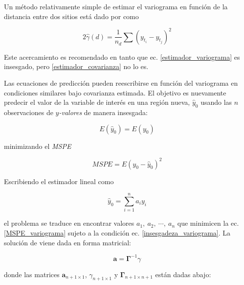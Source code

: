 \documentclass[14pt]{extarticle}
\begin{document}
Un método relativamente simple de estimar el variograma en función de la distancia entre dos sitios está dado por \cite{Thompson.2012} como

\begin{equation}
	2\hat{\gamma}(d) = \frac{1}{n_d}\sum (y_{t_i} - y_{t_j})^2 \label{estimador_variograma}
\end{equation}

Este acercamiento es recomendado\cite{Thompson.2012} en tanto que ec. \ref{estimador_variograma} es insesgado, pero \ref{estimador_covarianza} no lo es. 

Las ecuaciones de predicción pueden reescribirse en función del variograma en condiciones similares bajo covarianza estimada. El objetivo es nuevamente predecir el valor de la variable de interés en una región nueva, $\hat{y}_0$ usando las $n$ observaciones de \textit{$y$-valores} de manera insesgada:

\begin{equation}
	E\left(\hat{y}_0\right) = E\left(y_0\right) \label{insesgadeza_variograma}
\end{equation}

\noindent minimizando el \textit{MSPE}

\begin{equation}
	MSPE = E\left(y_0 - \hat{y}_0\right)^2\label{MSPE_variograma}
\end{equation}

\noindent Escribiendo el estimador lineal como

\begin{equation}
	\hat{y}_0 = \sum_{i=1}^{n} a_i y_i\label{estimador_predictivo_variograma}
\end{equation}

\noindent el problema se traduce en encontrar valores $a_1,\ a_2,\ \cdots,\ a_n$ que minimicen la ec. \ref{MSPE_variograma} sujeto a la condición ec. \ref{insesgadeza_variograma}. La solución de \cite{Thompson.2012} viene dada en forma matricial:

\begin{equation}
	\mathbf{a} = \mathbf{\Gamma}^{-1} \gamma\label{ecuacion_predictiva_variograma}
\end{equation}

\noindent donde las matrices $\mathbf{a}_{n+1\times1}$, $\gamma_{n+1\times1}$ y $\mathbf{\Gamma}_{n+1\times n+1}$ están dadas abajo:
\end{document}
